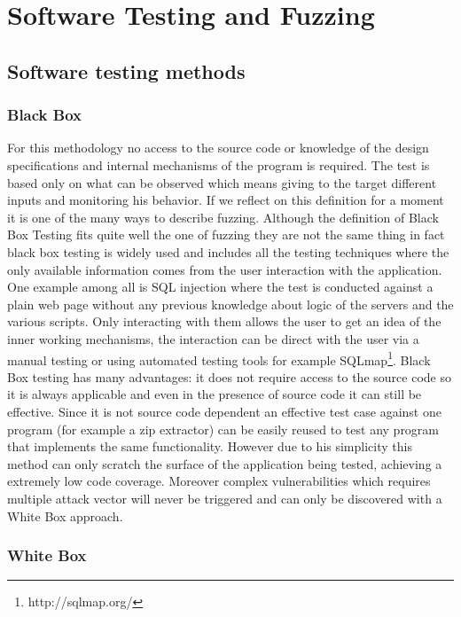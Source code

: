 \documentclass[../main.tex]{subfiles}
\begin{document}
\chapter{Software Testing and Fuzzing}
\label{chap:fuzzing}

\section{Software testing methods}

\subsection{Black Box}

For this methodology no access to the source code or knowledge of the design
specifications and internal mechanisms of the program is required. The test is
based only on what can be observed which means giving to the target different
inputs and monitoring his behavior. If we reflect on this definition for a
moment it is one of the many ways to describe fuzzing. Although the definition
of Black Box Testing fits quite well the one of fuzzing they are not the same
thing in fact black box testing is widely used and includes all the testing
techniques where the only available information comes from the user interaction
with the application. One example among all is SQL injection where the test is
conducted against a plain web page without any previous knowledge about logic of
the servers and the various scripts. Only interacting with them allows the user
to get an idea of the inner working mechanisms, the interaction can be direct
with the user via a manual testing or using automated testing tools for example
SQLmap\footnote{http://sqlmap.org/}. Black Box testing has many advantages: it
does not require access to the source code so it is always applicable and even
in the presence of source code it can still be effective. Since it is not source
code dependent an effective test case against one program (for example a zip
extractor) can be easily reused to test any program that implements the same
functionality. However due to his simplicity this method can only scratch the
surface of the application being tested, achieving a extremely low code
coverage. Moreover complex vulnerabilities which requires multiple attack vector
will never be triggered and can only be discovered with a White Box approach.

\subsection{White Box}
\end{document}
